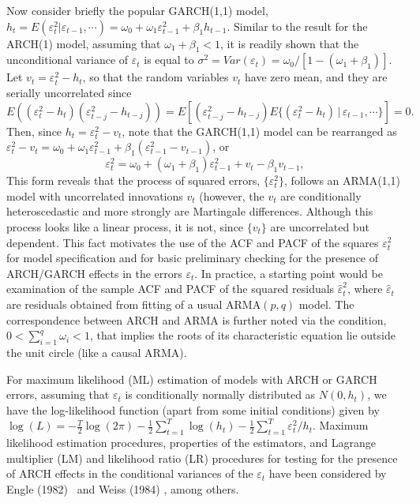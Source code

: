 Now consider briefly the popular GARCH(1,1) model, $h_t = E(\varepsilon_t^2|\varepsilon_{t-1},\cdots) = \omega_0 + \omega_1\varepsilon_{t-1}^2 + \beta_1h_{t-1}$. Similar to the result for the ARCH(1) model, assuming that $\omega_1 + \beta_1 < 1$, it is readily shown that the unconditional variance of $\varepsilon_t$ is equal to $\sigma^2 = Var(\varepsilon_t) = \omega_0/[1 - (\omega_1 + \beta_1)]$. Let $v_t = \varepsilon_t^2 - h_t$, so that the random variables $v_t$ have zero mean, and they are serially uncorrelated since
	\[
	E((\varepsilon_t^2 - h_t)(\varepsilon_{t-j}^2 - h_{t-j}))= E[(\varepsilon_{t-j}^2 - h_{t-j}) E\{(\varepsilon_t^2 - h_t) \,|\,\varepsilon_{t-1},\cdots\}] = 0.
	\]
Then, since $h_t = \varepsilon_t^2 - v_t$, note that the GARCH(1,1) model can be rearranged as $\varepsilon_t^2 - v_t = \omega_0 + \omega_1\varepsilon_{t-1}^2 + \beta_1(\varepsilon_{t-1}^2 - v_{t-1})$, or
	\begin{equation}\label{eqn:2ept}
	\varepsilon_t^2 = \omega_0 + (\omega_1 + \beta_1)\varepsilon_{t-1}^2 + v_t - \beta_1v_{t-1},
	\end{equation}
This form reveals that the process of squared errors, $\{\varepsilon_t^2\}$, follows an ARMA(1,1) model with uncorrelated innovations $v_t$ (however, the $v_t$ are conditionally heteroscedastic and more strongly are Martingale differences. Although this process looks like a linear process, it is not, since $ \{v_t\}$ are uncorrelated but dependent. This fact motivates the use of the ACF and PACF of the squares $\varepsilon_t^2$ for model specification and for basic preliminary checking for the presence of ARCH/GARCH effects in the errors $\varepsilon_t$. In practice, a starting point would be examination of the sample ACF and PACF of the squared residuals $\hat{\varepsilon}_t^2$, where $\hat{\varepsilon}_t$ are residuals obtained from fitting of a usual ARMA$(p,q)$ model. The correspondence between ARCH and ARMA is further noted via the condition, $0<\sum_{i=1}^q \omega_i<1$, that implies the roots of its characteristic equation lie outside the unit circle (like a causal ARMA).


For maximum likelihood (ML) estimation of models with ARCH or GARCH errors, assuming that $\varepsilon_t$ is conditionally normally distributed as $N(0,h_t)$, we have the log-likelihood function (apart from some initial conditions) given by $\log(L) = -\frac{T}{2} \log(2\pi) - \frac{1}{2}\sum_{t=1}^T \log(h_t) - \frac{1}{2}\sum_{t=1}^T \varepsilon_t^2/h_t$. Maximum likelihood estimation procedures, properties of the estimators, and Lagrange multiplier (LM) and likelihood ratio (LR) procedures for testing for the presence of ARCH effects in the conditional variances of the $\varepsilon_t$ have been considered by Engle (1982)~\cite{engle1982} and Weiss (1984) \cite{weiss1984}, among others.


